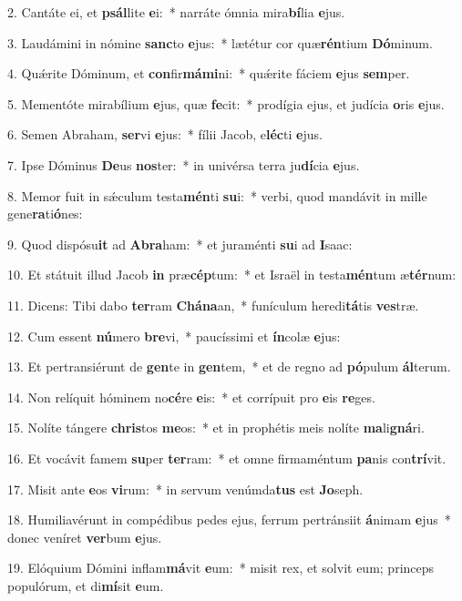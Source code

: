 2. Cantáte ei, et \textbf{psál}lite \textbf{e}i:~*  narráte ómnia mira\textbf{bí}lia \textbf{e}jus.\

3. Laudámini in nómine \textbf{sanc}to \textbf{e}jus:~*  lætétur cor quæ\textbf{rén}tium \textbf{Dó}minum.\

4. Quǽrite Dóminum, et \textbf{con}fir\textbf{má}\textbf{mi}ni:~*  quǽrite fáciem \textbf{e}jus \textbf{sem}per.\

5. Mementóte mirabílium \textbf{e}jus, quæ \textbf{fe}cit:~*  prodígia ejus, et judícia \textbf{o}ris \textbf{e}jus.\

6. Semen Abraham, \textbf{ser}vi \textbf{e}jus:~*  fílii Jacob, e\textbf{léc}ti \textbf{e}jus.\

7. Ipse Dóminus \textbf{De}us \textbf{nos}ter:~*  in univérsa terra ju\textbf{dí}cia \textbf{e}jus.\

8. Memor fuit in sǽculum testa\textbf{mén}ti \textbf{su}i:~*  verbi, quod mandávit in mille gene\textbf{ra}ti\textbf{ó}nes:\

9. Quod dispósu\textbf{it} ad \textbf{A}\textbf{bra}ham:~*  et juraménti \textbf{su}i ad \textbf{I}saac:\

10. Et státuit illud Jacob \textbf{in} præ\textbf{cép}tum:~*  et Israël in testa\textbf{mén}tum æ\textbf{tér}num:\

11. Dicens: Tibi dabo \textbf{ter}ram \textbf{Chá}\textbf{na}an,~*  funículum heredi\textbf{tá}tis \textbf{ves}træ.\

12. Cum essent \textbf{nú}mero \textbf{bre}vi,~*  paucíssimi et \textbf{ín}colæ \textbf{e}jus:\

13. Et pertransiérunt de \textbf{gen}te in \textbf{gen}tem,~*  et de regno ad \textbf{pó}pulum \textbf{ál}terum.\

14. Non relíquit hóminem no\textbf{cé}re \textbf{e}is:~*  et corrípuit pro \textbf{e}is \textbf{re}ges.\

15. Nolíte tángere \textbf{chris}tos \textbf{me}os:~*  et in prophétis meis nolíte \textbf{ma}li\textbf{gná}ri.\

16. Et vocávit famem \textbf{su}per \textbf{ter}ram:~*  et omne firmaméntum \textbf{pa}nis con\textbf{trí}vit.\

17. Misit ante \textbf{e}os \textbf{vi}rum:~*  in servum venúmda\textbf{tus} est \textbf{Jo}seph.\

18. Humiliavérunt in compédibus pedes ejus, ferrum pertránsiit \textbf{á}nimam \textbf{e}jus~*  donec veníret \textbf{ver}bum \textbf{e}jus.\

19. Elóquium Dómini inflam\textbf{má}vit \textbf{e}um:~*  misit rex, et solvit eum; princeps populórum, et di\textbf{mí}sit \textbf{e}um.\

